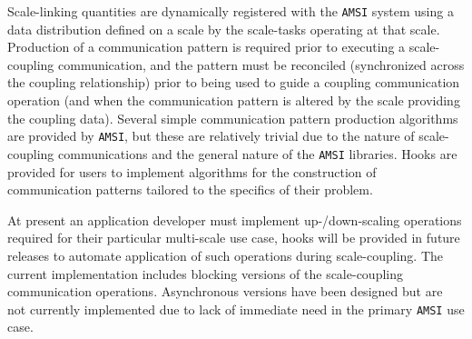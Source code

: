 \documentclass[11pt]{article}
\begin{document}
Scale-linking quantities are dynamically registered with the \verb|AMSI| system using a data distribution defined on a scale by the scale-tasks operating at that scale. Production of a communication pattern is required prior to executing a scale-coupling communication, and the pattern must be reconciled (synchronized across the coupling relationship) prior to being used to guide a coupling communication operation (and when the communication pattern is altered by the scale providing the coupling data). Several simple communication pattern production algorithms are provided by \verb|AMSI|, but these are relatively trivial due to the nature of scale-coupling communications and the general nature of the \verb|AMSI| libraries. Hooks are provided for users to implement algorithms for the construction of communication patterns tailored to the specifics of their problem.

At present an application developer must implement up-/down-scaling operations required for their particular multi-scale use case, hooks will be provided in future releases to automate application of such operations during scale-coupling. The current implementation includes blocking versions of the scale-coupling communication operations. Asynchronous versions have been designed but are not currently implemented due to lack of immediate need in the primary \verb|AMSI| use case.
\end{document}
